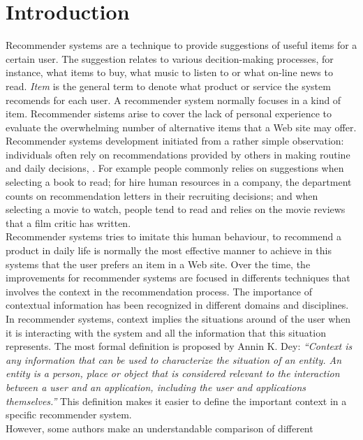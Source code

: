 \chapter{Introduction} \label{introduction} 

Recommender systems are a technique to provide suggestions of 
useful items for a certain user. The suggestion relates to various
decition-making processes, for instance, what items to buy, what music
to listen to or what on-line news to read. \textit{Item} is the general
term to denote what product or service  the system recomends for each
user. A recommender system normally focuses in a kind of item.
Recommender sistems arise to cover the lack of personal experience to
evaluate the overwhelming number of alternative items that a Web site
may offer\cite{resnick1997recommender}.
Recommender systems development initiated from a rather simple
observation: individuals often rely on recommendations provided by
others in making routine and daily decisions\cite{mahmood2009improving},
\cite{mcsherry2009differentially}. 
For example people commonly relies on suggestions when selecting a
book to read; for hire human resources in a company, the department
counts on recommendation letters in their recruiting decisions; and
when selecting a movie to watch, people tend to read and relies on the
movie reviews that a film critic has written.\\
Recommender systems tries to imitate this human behaviour, to
recommend a product in daily life is normally the most effective
manner to achieve in this systems that the user prefers an item in a
Web site. Over the time, the improvements for recommender systems are
focused in differents techniques that involves the context in the
recommendation process.  The importance of contextual information has
been recognized in different domains and disciplines. In recommender
systems, context implies the situations around of the user when it is
interacting with the system and all the information that this
situation represents.
The most formal definition is proposed by Annin K.
Dey\cite{dey2001understanding}: \textit{``Context is any information
that can be used to characterize the situation of an entity. An entity
is a person, place or object that is considered relevant to the
interaction between a user and an application, including the user and
applications themselves.''} This definition makes it easier to define
the important context in a specific recommender system.\\ 
However, some authors make an understandable comparison of different 
